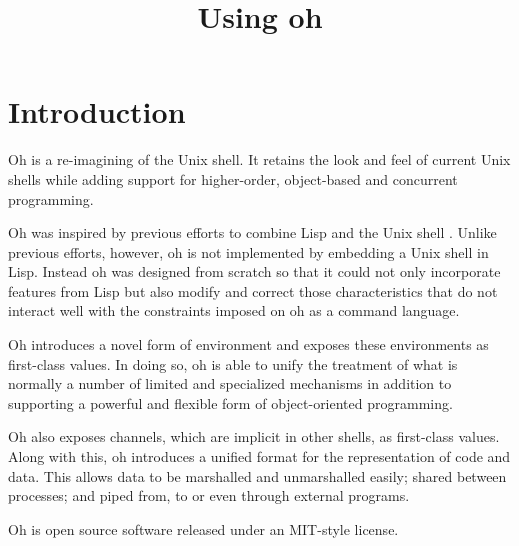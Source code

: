 \documentclass[12pt]{book}
\begin{document}
\title{\Huge \bf Using oh}
\author{}
\date{}

\maketitle

\chapter{Introduction}
Oh is a re-imagining of the Unix shell. It retains the look and feel of
current Unix shells while adding support for higher-order, object-based and
concurrent programming.

Oh was inspired by previous efforts to combine Lisp and the Unix shell
\cite{ALispShell, scsh}. Unlike previous efforts, however, oh is not
implemented by embedding a Unix shell in Lisp. Instead oh was designed
from scratch so that it could not only incorporate features from Lisp but
also modify and correct those characteristics that do not interact well
with the constraints imposed on oh as a command language.

Oh introduces a novel form of environment and exposes these environments
as first-class values. In doing so, oh is able to unify the treatment of
what is normally a number of limited and specialized mechanisms in addition
to supporting a powerful and flexible form of object-oriented programming.

Oh also exposes channels, which are implicit in other shells, as first-class
values. Along with this, oh introduces a unified format for the
representation of code and data. This allows data to be marshalled and
unmarshalled easily; shared between processes; and piped from, to or even
through external programs.

Oh is open source software released under an MIT-style license.


\end{document}
